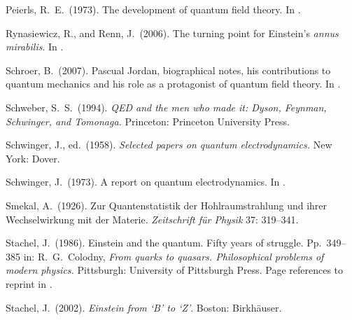 \documentclass[12pt]{elsart}
\begin{document}
{\begin{thebibliography}{}
 Peierls, R.\ E.\ (1973). The development of quantum field theory. In \citep[pp.\ 370--379]{Mehra 1973}.


 Rynasiewicz, R., and Renn, J.\ (2006). The turning point for Einstein's {\it annus mirabilis}. In \citep[5--35]{Janssen 2006}.

 Schroer, B.\ (2007). Pascual Jordan, biographical notes, his contributions to quantum mechanics and his role as a protagonist of quantum field theory. In \citep[pp.\ 47--68]{Hoffmann 2007}. 

 Schweber, S.\ S.\ (1994). {\it QED and the men who made it: Dyson, Feynman, Schwinger, and Tomonaga.} Princeton: Princeton University Press.

 Schwinger, J., ed.\ (1958). {\it Selected papers on quantum electrodynamics.} New York: Dover.

 Schwinger, J.\ (1973). A report on quantum electrodynamics. In \citep[pp.\ 412--413]{Mehra 1973}.

 Smekal, A.\ (1926). Zur Quantenstatistik der Hohlraumstrahlung und ihrer Wechselwirkung mit der Materie. {\it Zeitschrift f\"ur Physik} 37: 319--341. 

 Stachel,  J.\ (1986). Einstein and the quantum. Fifty years of struggle. Pp.\ 349--385 in: R.\ G.\ Colodny, {\it From quarks to quasars. Philosophical problems of modern physics.} Pittsburgh: University of Pittsburgh Press. Page references to reprint in \citep[pp.\ 367--402]{Stachel 2002}.

 Stachel,  J.\ (2002). {\it Einstein from `B' to `Z'}. Boston: Birkh\"{a}user.




\end{thebibliography}}
\end{document}
